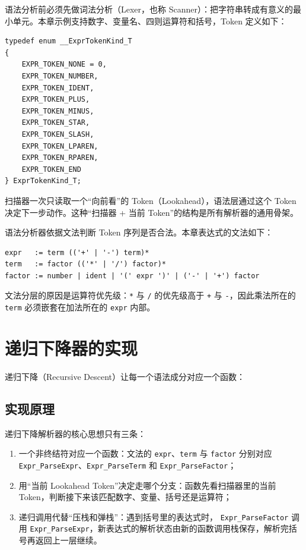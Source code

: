 语法分析前必须先做词法分析（Lexer，也称 Scanner）：把字符串转成有意义的最小单元。本章示例支持数字、变量名、四则运算符和括号，Token 定义如下：

\begin{lstlisting}[style=c]
typedef enum __ExprTokenKind_T
{
    EXPR_TOKEN_NONE = 0,
    EXPR_TOKEN_NUMBER,
    EXPR_TOKEN_IDENT,
    EXPR_TOKEN_PLUS,
    EXPR_TOKEN_MINUS,
    EXPR_TOKEN_STAR,
    EXPR_TOKEN_SLASH,
    EXPR_TOKEN_LPAREN,
    EXPR_TOKEN_RPAREN,
    EXPR_TOKEN_END
} ExprTokenKind_T;
\end{lstlisting}

扫描器一次只读取一个“向前看”的 Token（Lookahead），语法层通过这个 Token 决定下一步动作。这种“扫描器 + 当前 Token”的结构是所有解析器的通用骨架。

语法分析器依据文法判断 Token 序列是否合法。本章表达式的文法如下：

\begin{lstlisting}
expr   := term (('+' | '-') term)*
term   := factor (('*' | '/') factor)*
factor := number | ident | '(' expr ')' | ('-' | '+') factor
\end{lstlisting}

文法分层的原因是运算符优先级：\texttt{*} 与 \texttt{/} 的优先级高于 \texttt{+} 与 \texttt{-}，因此乘法所在的 \texttt{term} 必须嵌套在加法所在的 \texttt{expr} 内部。

\section{递归下降器的实现}

递归下降（Recursive Descent）让每一个语法成分对应一个函数：

\subsection{实现原理}

递归下降解析器的核心思想只有三条：

\begin{enumerate}
\item 一个非终结符对应一个函数：文法的 \texttt{expr}、\texttt{term} 与 \texttt{factor} 分别对应 \texttt{Expr\_ParseExpr}、\texttt{Expr\_ParseTerm} 和 \texttt{Expr\_ParseFactor}；
\item 用“当前 Lookahead Token”决定走哪个分支：函数先看扫描器里的当前 Token，判断接下来该匹配数字、变量、括号还是运算符；
\item 递归调用代替“压栈和弹栈”：遇到括号里的表达式时， \texttt{Expr\_ParseFactor} 调用 \texttt{Expr\_ParseExpr}，新表达式的解析状态由新的函数调用栈保存，解析完括号再返回上一层继续。
\end{enumerate}

